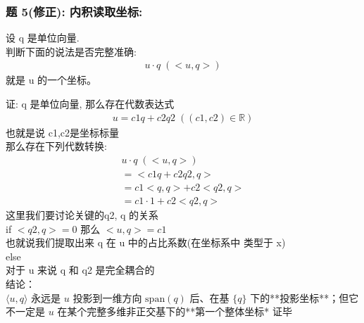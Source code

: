 \documentclass[12pt]{article}
\begin{document}
\begin{flushleft}
    \subsubsection{题 5(修正): 内积读取坐标:}
    设 q 是单位向量. \\
    判断下面的说法是否完整准确: \\
    \begin{align}
        u \cdot q \;(<u,q>)
    \end{align}
    就是 u 的一个坐标。

    证: q 是单位向量, 那么存在代数表达式
    \begin{align}
        u = c1q + c2q2 \; ((c1, c2) \in \mathbb{R})
    \end{align}
    也就是说 c1,c2是坐标标量  \\
    那么存在下列代数转换: \\
    \begin{align}
        u \cdot q \;(<u,q>)  \\
        = <c1q + c2q2, q>    \\
        = c1<q,q> + c2<q2,q> \\
        = c1 \cdot 1  + c2<q2,q>
    \end{align}
    这里我们要讨论关键的q2, q 的关系 \\
    if $<q2, q> = 0$ 那么 $<u,q> = c1$ \\
    也就说我们提取出来 q 在 u 中的占比系数(在坐标系中 类型于 x) \\
    else \\
    对于 u 来说 q 和 q2 是完全耦合的 \\

    结论：\\
    $\langle u, q \rangle$ 永远是 $u$ 投影到一维方向 $\text{span}(q)$ 后、在基 $\{q\}$ 下的**投影坐标**；但它不一定是 $u$ 在某个完整多维非正交基下的**第一个整体坐标*
    证毕


\end{flushleft}
\end{document}

